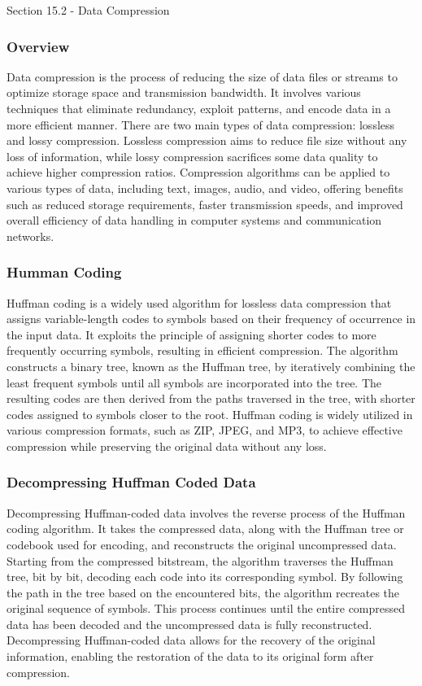 \begin{notes}{Section 15.2 - Data Compression}
    \subsubsection{Overview}

    Data compression is the process of reducing the size of data files or streams to optimize storage space and transmission bandwidth. It involves various techniques that eliminate redundancy, exploit patterns, 
    and encode data in a more efficient manner. There are two main types of data compression: lossless and lossy compression. Lossless compression aims to reduce file size without any loss of information, while 
    lossy compression sacrifices some data quality to achieve higher compression ratios. Compression algorithms can be applied to various types of data, including text, images, audio, and video, offering benefits 
    such as reduced storage requirements, faster transmission speeds, and improved overall efficiency of data handling in computer systems and communication networks.
    
    \subsubsection{Humman Coding}
    
    Huffman coding is a widely used algorithm for lossless data compression that assigns variable-length codes to symbols based on their frequency of occurrence in the input data. It exploits the principle of 
    assigning shorter codes to more frequently occurring symbols, resulting in efficient compression. The algorithm constructs a binary tree, known as the Huffman tree, by iteratively combining the least frequent 
    symbols until all symbols are incorporated into the tree. The resulting codes are then derived from the paths traversed in the tree, with shorter codes assigned to symbols closer to the root. Huffman coding is 
    widely utilized in various compression formats, such as ZIP, JPEG, and MP3, to achieve effective compression while preserving the original data without any loss.
    
    \subsubsection{Decompressing Huffman Coded Data}
    
    Decompressing Huffman-coded data involves the reverse process of the Huffman coding algorithm. It takes the compressed data, along with the Huffman tree or codebook used for encoding, and reconstructs the 
    original uncompressed data. Starting from the compressed bitstream, the algorithm traverses the Huffman tree, bit by bit, decoding each code into its corresponding symbol. By following the path in the tree based 
    on the encountered bits, the algorithm recreates the original sequence of symbols. This process continues until the entire compressed data has been decoded and the uncompressed data is fully reconstructed. 
    Decompressing Huffman-coded data allows for the recovery of the original information, enabling the restoration of the data to its original form after compression.
\end{notes}